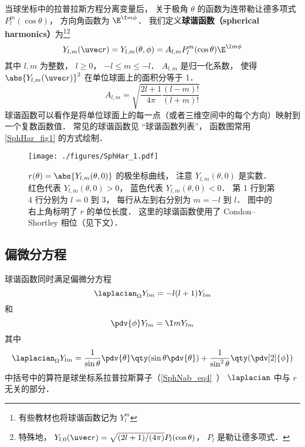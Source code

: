 

当球坐标中的拉普拉斯方程分离变量后， 关于极角 $\theta$ 的函数为连带勒让德多项式 $P_l^m(\cos\theta)$， 方向角函数为 $\E^{\I m\phi}$． 我们定义\textbf{球谐函数（spherical harmonics）}为\footnote{有些教材也将球谐函数记为 $Y_l^m$}\footnote{特殊地， $Y_{l,0}(\uvec r) = \sqrt{(2l + 1)/(4\pi)}P_l(\cos\theta)$， $P_l$ 是勒让德多项式．}
\begin{equation}\label{SphHar_eq1}
Y_{l, m} (\uvec r) = Y_{l, m}(\theta, \phi) = A_{l,m} P_l^m(\cos \theta) \E^{\I m\phi}
\end{equation}
其中 $l, m$ 为整数， $l \ge 0$， $-l \le m \le -l$． $A_{l,m}$ 是归一化系数， 使得 $\abs{Y_{l, m} (\uvec r)}^2$ 在单位球面上的面积分等于 1．
\begin{equation}\label{SphHar_eq2}
A_{l,m} =  \sqrt{\frac{2l + 1}{4\pi }\frac{(l - m)!}{(l + m)!}}
\end{equation}
球谐函数可以看作是将单位球面上的每一点（或者三维空间中的每个方向）映射到一个复数函数值． 常见的球谐函数见 “球谐函数列表”， 函数图常用\autoref{SphHar_fig1} 的方式绘制．

\begin{figure}[ht]
\centering
\texttt{[image: ./figures/SphHar\_1.pdf]}
\caption{$r(\theta) = \abs{Y_{l,m}(\theta, 0)}$ 的极坐标曲线， 注意 $Y_{l,m}(\theta, 0)$ 是实数． 红色代表 $Y_{l,m}(\theta, 0) > 0$， 蓝色代表 $Y_{l,m}(\theta, 0) < 0$． 第 1 行到第 4 行分别为 $l = 0$ 到 $3$， 每行从左到右分别为 $m = -l$ 到 $l$． 图中的右上角标明了 $r$ 的单位长度． 这里的球谐函数使用了 Condon–Shortley 相位（见下文）．} \label{SphHar_fig1}
\end{figure}

\subsection{偏微分方程}
球谐函数同时满足偏微分方程
\begin{equation}
\laplacian_\Omega Y_{lm} = -l(l+1)Y_{lm}
\end{equation}
和
\begin{equation}
\pdv{\phi} Y_{lm} = \I m Y_{lm}
\end{equation}
其中
\begin{equation}
\laplacian_\Omega Y_{lm} = \frac{1}{\sin\theta}\pdv{\theta} \qty(\sin \theta \pdv{\theta}) + \frac{1}{\sin^2 \theta} \qty(\pdv[2]{\phi})
\end{equation}
中括号中的算符是球坐标系拉普拉斯算子（\autoref{SphNab_eq4}~） $\laplacian$ 中与 $r$ 无关的部分．

